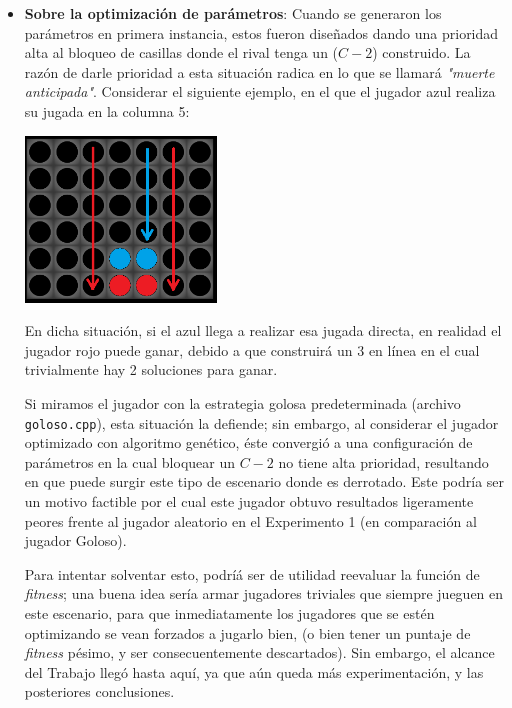 \documentclass[12pt,a4paper]{article}
\begin{document}
\begin{itemize}
                \item \textbf{Sobre la optimización de parámetros}: Cuando se generaron los parámetros en primera instancia, estos fueron diseñados dando una prioridad alta al bloqueo de casillas donde el rival tenga un ($C-2$) construido. La razón de darle prioridad a esta situación radica en lo que se llamará \textit{"muerte anticipada"}. Considerar el siguiente ejemplo, en el que el jugador azul realiza su jugada en la columna 5:
                
                \begin{center}
                \includegraphics[width=0.4\textwidth]{muerteHorizontal.png}
                \end{center}
                
                En dicha situación, si el azul llega a realizar esa jugada directa, en realidad el jugador rojo puede ganar, debido a que construirá un 3 en línea en el cual trivialmente hay 2 soluciones para ganar.
                
                Si miramos el jugador con la estrategia golosa predeterminada (archivo \texttt{goloso.cpp}), esta situación la defiende; sin embargo, al considerar el jugador optimizado con algoritmo genético, éste convergió a una configuración de parámetros en la cual bloquear un $C-2$ no tiene alta prioridad, resultando en que puede surgir este tipo de escenario donde es derrotado. Este podría ser un motivo factible por el cual este jugador obtuvo resultados ligeramente peores frente al jugador aleatorio en el Experimento 1 (en comparación al jugador Goloso).
                
                Para intentar solventar esto, podríá ser de utilidad reevaluar la función de \textit{fitness}; una buena idea sería armar jugadores triviales que siempre jueguen en este escenario, para que inmediatamente los jugadores que se estén optimizando se vean forzados a jugarlo bien, (o bien  tener un puntaje de \textit{fitness} pésimo, y ser consecuentemente descartados). Sin embargo, el alcance del Trabajo llegó hasta aquí, ya que aún queda más experimentación, y las posteriores conclusiones.
                
    \end{itemize}
    
\end{document}
